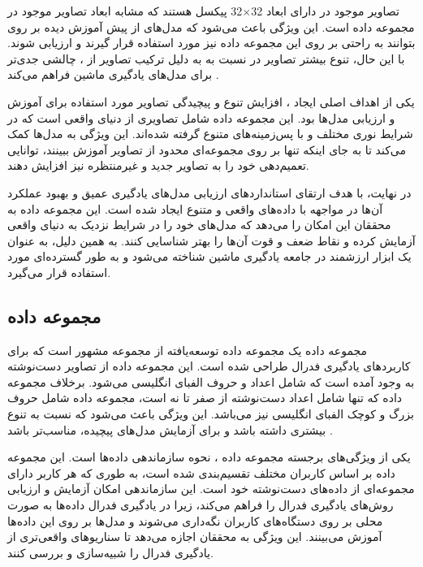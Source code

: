 تصاویر موجود در
دارای ابعاد
32$\times$32
پیکسل هستند که مشابه ابعاد تصاویر موجود در مجموعه داده
است. این ویژگی باعث می‌شود که مدل‌های از پیش آموزش دیده بر روی
بتوانند به راحتی بر روی این مجموعه داده نیز مورد استفاده قرار گیرند و ارزیابی شوند. با این حال، تنوع بیشتر تصاویر در
نسبت به
به دلیل ترکیب تصاویر از
،
چالشی جدی‌تر برای مدل‌های یادگیری ماشین فراهم می‌کند
\cite{darlow2018cinic}.


یکی از اهداف اصلی ایجاد
،
افزایش تنوع و پیچیدگی تصاویر مورد استفاده برای آموزش و ارزیابی مدل‌ها بود. این مجموعه داده شامل تصاویری از دنیای واقعی است که در شرایط نوری مختلف و با پس‌زمینه‌های متنوع گرفته شده‌اند. این ویژگی به مدل‌ها کمک می‌کند تا به جای اینکه تنها بر روی مجموعه‌ای محدود از تصاویر آموزش ببینند، توانایی تعمیم‌دهی خود را به تصاویر جدید و غیرمنتظره نیز افزایش دهند.

در نهایت،
با هدف ارتقای استانداردهای ارزیابی مدل‌های یادگیری عمیق و بهبود عملکرد آن‌ها در مواجهه با داده‌های واقعی و متنوع ایجاد شده است. این مجموعه داده به محققان این امکان را می‌دهد که مدل‌های خود را در شرایط نزدیک به دنیای واقعی آزمایش کرده و نقاط ضعف و قوت آن‌ها را بهتر شناسایی کنند. به همین دلیل،
به عنوان یک ابزار ارزشمند در جامعه یادگیری ماشین شناخته می‌شود و به طور گسترده‌ای مورد استفاده قرار می‌گیرد.


\subsection{
	مجموعه داده
}
مجموعه داده
یک مجموعه داده توسعه‌یافته از مجموعه مشهور
است که برای کاربردهای یادگیری فدرال طراحی شده است. این مجموعه داده از تصاویر دست‌نوشته به وجود آمده است که شامل اعداد و حروف الفبای انگلیسی می‌شود. برخلاف مجموعه داده
که تنها شامل اعداد دست‌نوشته از صفر تا نه است، مجموعه داده
شامل حروف بزرگ و کوچک الفبای انگلیسی نیز می‌باشد. این ویژگی باعث می‌شود که
نسبت به
تنوع بیشتری داشته باشد و برای آزمایش مدل‌های پیچیده‌، مناسب‌تر باشد
\cite{caldas2018leaf}.

یکی از ویژگی‌های برجسته مجموعه داده
،
نحوه سازماندهی داده‌ها است. این مجموعه داده بر اساس کاربران مختلف تقسیم‌بندی شده است، به طوری که هر کاربر دارای مجموعه‌ای از داده‌های دست‌نوشته خود است. این سازماندهی امکان آزمایش و ارزیابی روش‌های یادگیری فدرال را فراهم می‌کند، زیرا در یادگیری فدرال داده‌ها به صورت محلی بر روی دستگاه‌های کاربران نگه‌داری می‌شوند و مدل‌ها بر روی این داده‌ها آموزش می‌بینند. این ویژگی به محققان اجازه می‌دهد تا سناریوهای واقعی‌تری از یادگیری فدرال را شبیه‌سازی و بررسی کنند.

